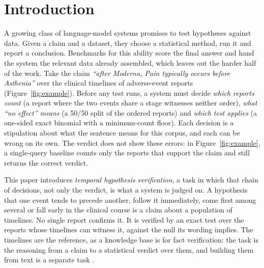 %
\newcommand{\pend}[1]{\textit{#1}}
\newcommand{\sys}{\textsc{Strata}}
\newcommand{\art}{\textsc{Art}}



\section{Introduction}
\label{sec:intro}

A growing class of language-model systems promises to test hypotheses
against data. Given a claim and a dataset, they choose a statistical method,
run it and report a conclusion. Benchmarks for this ability
\cite{miao2026fisher,zhu2024statqa,zhu2026statabench} score the final answer
and hand the system the relevant data already assembled, which leaves out
the harder half of the work. Take the claim \emph{``after Moderna, Pain
typically occurs before Asthenia''} over the clinical timelines of
adverse-event reports (Figure~\ref{fig:example}). Before any test runs, a
system must decide \emph{which reports count} (a report where the two events
share a stage witnesses neither order), \emph{what ``no effect'' means} (a
50/50 split of the ordered reports) and \emph{which test applies} (a
one-sided exact binomial with a minimum-count floor). Each decision is a
stipulation about what the sentence means for this corpus, and each can be
wrong on its own. The verdict does not show these errors: in
Figure~\ref{fig:example}, a single-query baseline counts only the reports
that support the claim and still returns the correct verdict.

This paper introduces \emph{temporal hypothesis verification}, a task in
which that chain of decisions, not only the verdict, is what a system is
judged on. A hypothesis that one event tends to precede another, follow it
immediately, come first among several or fall early in the clinical course
is a claim about a population of timelines. No single report confirms it. It
is verified by an exact test over the reports whose timelines can witness
it, against the null its wording implies. The timelines are the reference,
as a knowledge base is for fact verification: the task is the reasoning from
a claim to a statistical verdict over them, and building them from text is a
separate task \cite{craft2026}.

